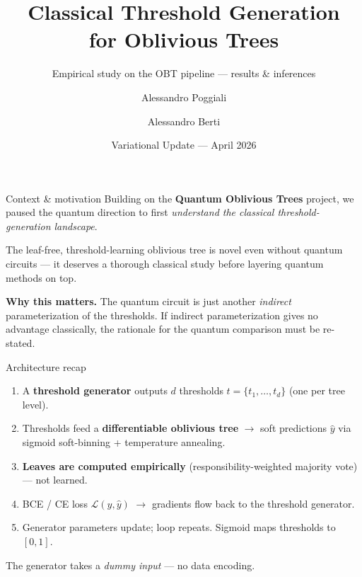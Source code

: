 \documentclass[aspectratio=169,10pt]{beamer}
\title[Classical Threshold Generation for OBT]{Classical Threshold Generation\\ for Oblivious Trees}
\subtitle{Empirical study on the OBT pipeline --- results \& inferences}
\author[Poggiali, Berti]{Alessandro Poggiali \and Alessandro Berti}
\date{Variational Update --- April 2026}
\begin{document}
\begin{frame}
  \titlepage
\end{frame}

\begin{frame}{Context \& motivation}
  Building on the \textbf{Quantum Oblivious Trees} project, we paused the quantum
  direction to first \emph{understand the classical threshold-generation landscape}.

  \medskip
  The leaf-free, threshold-learning oblivious tree is novel even without quantum
  circuits --- it deserves a thorough classical study before layering quantum
  methods on top.

  \medskip
  \textbf{Why this matters.} The quantum circuit is just another \emph{indirect}
  parameterization of the thresholds. If indirect parameterization gives no
  advantage classically, the rationale for the quantum comparison must be
  re-stated.
\end{frame}

\begin{frame}{Architecture recap}
  \begin{enumerate}
    \item A \textbf{threshold generator} outputs $d$ thresholds $t = \{t_1, \dots, t_d\}$ (one per tree level).
    \item Thresholds feed a \textbf{differentiable oblivious tree} $\rightarrow$ soft predictions $\hat{y}$ via sigmoid soft-binning + temperature annealing.
    \item \textbf{Leaves are computed empirically} (responsibility-weighted majority vote) --- not learned.
    \item BCE / CE loss $\mathcal{L}(y, \hat{y})$ $\rightarrow$ gradients flow back to the threshold generator.
    \item Generator parameters update; loop repeats. Sigmoid maps thresholds to $[0, 1]$.
  \end{enumerate}

  \medskip
  The generator takes a \emph{dummy input} --- no data encoding.
\end{frame}
\end{document}

